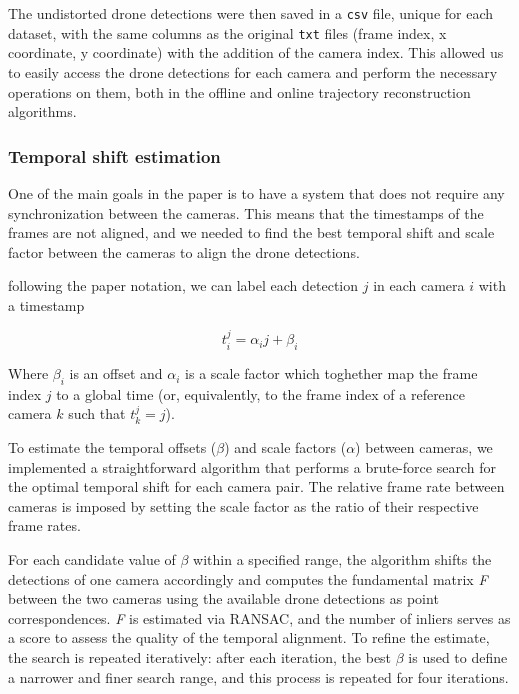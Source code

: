 \documentclass[11pt]{article}
\begin{document}
The undistorted drone detections were then saved in a \texttt{csv} file, unique for each dataset, with the same columns as the original \texttt{txt} files (frame index, x coordinate, y coordinate) with the addition of the camera index. This allowed us to easily access the drone detections for each camera and perform the necessary operations on them, both in the offline and online trajectory reconstruction algorithms.

\subsubsection{Temporal shift estimation}

One of the main goals in the paper is to have a system that does not require any synchronization between the cameras. This means that the timestamps of the frames are not aligned, and we needed to find the best temporal shift and scale factor between the cameras to align the drone detections.

following the paper notation, we can label each detection $j$ in each camera $i$ with a timestamp

\begin{equation}
    t_i^j = \alpha_i j + \beta_i
\end{equation}

Where $\beta_i$ is an offset and $\alpha_i$ is a scale factor which toghether map the frame index $j$ to a global time (or, equivalently, to the frame index of a reference camera $k$ such that $t_k^j = j$).

To estimate the temporal offsets ($\beta$) and scale factors ($\alpha$) between cameras, we implemented a straightforward algorithm that performs a brute-force search for the optimal temporal shift for each camera pair. The relative frame rate between cameras is imposed by setting the scale factor as the ratio of their respective frame rates.

For each candidate value of $\beta$ within a specified range, the algorithm shifts the detections of one camera accordingly and computes the fundamental matrix \textit{F} between the two cameras using the available drone detections as point correspondences. \textit{F} is estimated via RANSAC, and the number of inliers serves as a score to assess the quality of the temporal alignment. To refine the estimate, the search is repeated iteratively: after each iteration, the best $\beta$ is used to define a narrower and finer search range, and this process is repeated for four iterations.
\end{document}
